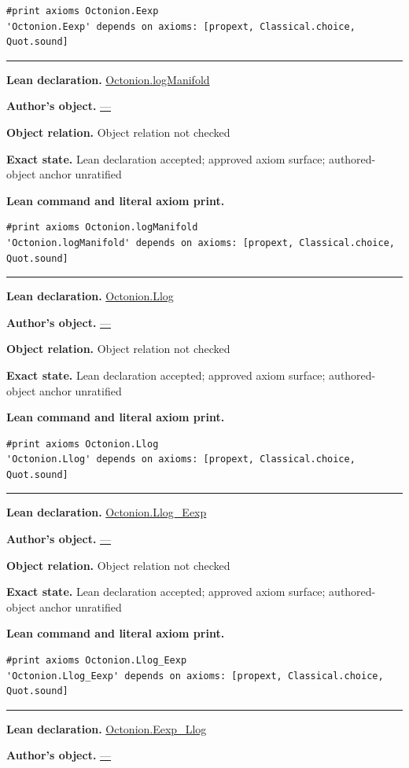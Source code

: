 \documentclass[11pt]{article}
\theoremstyle{plain}
\theoremstyle{definition}
\theoremstyle{remark}
\begin{document}
\begin{tcolorbox}
\begin{Verbatim}[breaklines=true,breakanywhere=true,fontsize=\small]
#print axioms Octonion.Eexp
'Octonion.Eexp' depends on axioms: [propext, Classical.choice, Quot.sound]
\end{Verbatim}
\medskip\hrule\medskip
\textbf{Lean declaration.} \url{Octonion.logManifold}
\par\textbf{Author's object.} \url{—}
\par\textbf{Object relation.} Object relation not checked
\par\textbf{Exact state.} Lean declaration accepted; approved axiom surface; authored-object anchor unratified
\par\smallskip\textbf{Lean command and literal axiom print.}
\begin{Verbatim}[breaklines=true,breakanywhere=true,fontsize=\small]
#print axioms Octonion.logManifold
'Octonion.logManifold' depends on axioms: [propext, Classical.choice, Quot.sound]
\end{Verbatim}
\medskip\hrule\medskip
\textbf{Lean declaration.} \url{Octonion.Llog}
\par\textbf{Author's object.} \url{—}
\par\textbf{Object relation.} Object relation not checked
\par\textbf{Exact state.} Lean declaration accepted; approved axiom surface; authored-object anchor unratified
\par\smallskip\textbf{Lean command and literal axiom print.}
\begin{Verbatim}[breaklines=true,breakanywhere=true,fontsize=\small]
#print axioms Octonion.Llog
'Octonion.Llog' depends on axioms: [propext, Classical.choice, Quot.sound]
\end{Verbatim}
\medskip\hrule\medskip
\textbf{Lean declaration.} \url{Octonion.Llog_Eexp}
\par\textbf{Author's object.} \url{—}
\par\textbf{Object relation.} Object relation not checked
\par\textbf{Exact state.} Lean declaration accepted; approved axiom surface; authored-object anchor unratified
\par\smallskip\textbf{Lean command and literal axiom print.}
\begin{Verbatim}[breaklines=true,breakanywhere=true,fontsize=\small]
#print axioms Octonion.Llog_Eexp
'Octonion.Llog_Eexp' depends on axioms: [propext, Classical.choice, Quot.sound]
\end{Verbatim}
\medskip\hrule\medskip
\textbf{Lean declaration.} \url{Octonion.Eexp_Llog}
\par\textbf{Author's object.} \url{—}

\end{tcolorbox}
\end{document}
